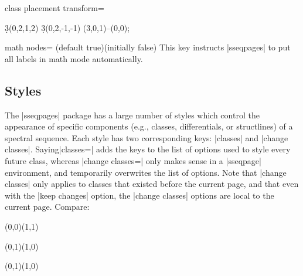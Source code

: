 \documentclass{ltxdoc}
\begin{document}
\begin{sseqdata}[name=ex1,degree={#1}{1-#1}]
\begin{key}{class placement transform=}
\begin{codeexample}[width=5cm]
\begin{sseqpage}[classes=fill,class placement transform={rotate=40},
                 cohomological Serre grading,differentials=blue,scale=0.7]
\d3(0,2,1,2)
\d3(0,2,-1,-1)
\draw[->,red](3,0,1)--(0,0);
\end{sseqpage}
\end{codeexample}
\end{key}

\begin{key}{math nodes= (default true)(initially false)}
This key instructs |sseqpages| to put all labels in math mode automatically.
\end{key}

\subsection{Styles}
The |sseqpages| package has a large number of styles which control the appearance of specific components (e.g., classes, differentials, or structlines) of a spectral sequence. Each style has two corresponding keys: |classes| and |change classes|.  Saying|classes=| adds the keys to the list of options used to style every future class, whereas |change classes=| only makes sense in a |sseqpage| environment, and temporarily overwrites the list of options. Note that |change classes| only applies to classes that existed before the current page, and that even with the |keep changes| option, the |change classes| options are local to the current page. Compare:
\begin{codeexample}[width=8cm]
\begin{sseqdata}[name=stylesex]
\class(0,0)\class(1,1)
\end{sseqdata}
\begin{sseqpage}[name=stylesex,classes={fill,blue},
    title={change new classes}
]
\class(0,1)\class(1,0)
\end{sseqpage}

\begin{sseqpage}[name=stylesex,
    change classes={fill,blue},
    title={change old classes}
]
\class(0,1)\class(1,0)
\end{sseqpage}
\end{codeexample}



\end{sseqdata}
\end{document}
